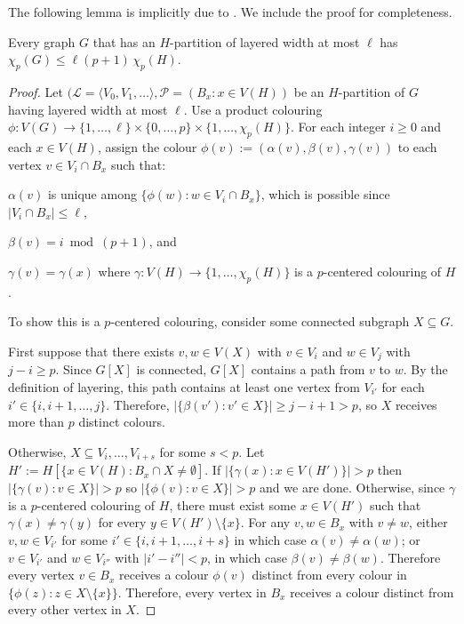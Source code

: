 \documentclass{patmorin}
\newcommand{\note}[2]{{\color{red}[#1:~#2]}}
\renewcommand{\ge}{\geqslant}
\renewcommand{\le}{\leqslant}
\begin{document}
The following lemma is implicitly due to \citet{micek:personal}. We include the proof for completeness.


\begin{lem}
\label{p-centered}
Every graph $G$ that has an $H$-partition of layered width at most $\ell$ has $\chi_p(G)\le \ell (p+1)\, \chi_p(H)$. 
\end{lem}

\begin{proof}
   Let $(\mathcal{L}=\langle V_0,V_1,\ldots\rangle, \mathcal{P}=(B_x:x\in V(H))$ be an $H$-partition of $G$ having layered width at most $\ell$.
   Use a product colouring $\phi:V(G)\to \{1,\ldots,\ell\}\times\{0,\ldots,p\}\times\{1,\ldots,\chi_p(H)\}$.  For each integer $i\ge 0$ and each $x\in V(H)$, assign the colour $\phi(v):=(\alpha(v),\beta(v),\gamma(v))$ to each vertex $v\in V_i\cap B_x$ such that:
   \begin{compactenum}
     \item $\alpha(v)$ is unique among $\{\phi(w): w\in V_i\cap B_x\}$, which is possible 
     since $|V_i\cap B_x|\le \ell$,
     \item $\beta(v)= i\bmod (p+1)$, and     
     \item $\gamma(v)=\gamma(x)$ where $\gamma:V(H)\to\{1,\ldots,\chi_p(H)\}$ is a $p$-centered colouring of $H$.
   \end{compactenum}
 To show this is a $p$-centered colouring, consider some connected subgraph $X\subseteq G$.
 
 First suppose that there exists $v,w\in V(X)$ with $v\in V_i$ and $w\in V_j$ with $j-i\ge p$. Since $G[X]$ is connected, $G[X]$ contains a path from $v$ to $w$.  By the definition of layering, this path contains at least one vertex from $V_{i'}$ for each $i'\in\{i,i+1,\ldots,j\}$. Therefore, $|\{\beta(v'):v'\in X\}|\ge j-i+1 > p$, so $X$ receives more than $p$ distinct colours.
 
 Otherwise, $X\subseteq V_{i},\ldots,V_{i+s}$ for some $s<p$.  Let $H':=H[\{x\in V(H):B_x\cap X\neq\emptyset]$.  If $|\{\gamma(x):x\in V(H')\}| > p$ then $|\{\gamma(v):v\in X\}|> p$ so $|\{\phi(v):v\in X\}|> p$ and we are done.  Otherwise, since $\gamma$ is a $p$-centered colouring of $H$, there must exist some $x\in V(H')$ such that $\gamma(x)\neq\gamma(y)$ for every $y\in V(H')\setminus\{x\}$.
 For any $v,w\in B_x$ with $v\neq w$, either $v,w\in V_{i'}$ for some $i'\in\{i,i+1,\ldots,i+s\}$ in which case $\alpha(v)\neq\alpha(w)$; or $v\in V_{i'}$ and $w\in V_{i''}$ with $|i'-i''|< p$, in which case $\beta(v)\neq\beta(w)$. Therefore every vertex $v\in B_x$ receives a colour $\phi(v)$ distinct from every colour in $\{\phi(z):z\in X\setminus\{x\}\}$. Therefore, every vertex in $B_x$ receives a colour distinct from every other vertex in $X$.
 \end{proof}
\end{document}
